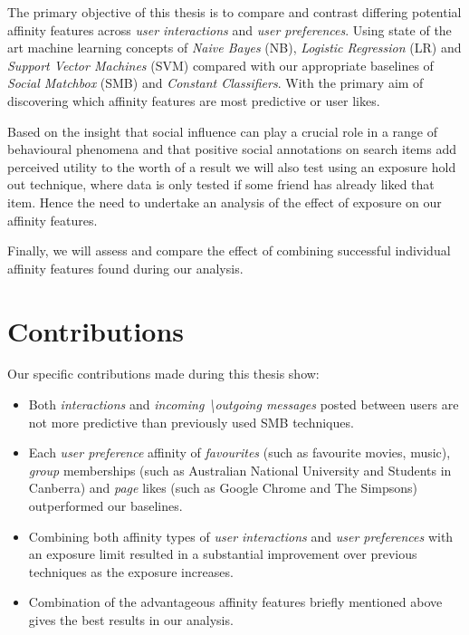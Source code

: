 The primary objective of this thesis is to compare and contrast differing potential affinity features across \emph{user interactions} and 
\emph{user preferences}. Using state of the art machine learning concepts of \emph{Naive Bayes} (NB), \emph{Logistic Regression} (LR) 
and \emph{Support Vector Machines} (SVM) compared with our appropriate baselines of \emph{Social Matchbox} (SMB) and \emph{Constant Classifiers}. 
With the primary aim of discovering which affinity features are most predictive or user likes.

Based on the insight that social inﬂuence can play a crucial role in a range of behavioural phenomena \cite{grano,watts} and that
positive social annotations on search items add perceived utility to the worth of a result \cite{pantel} we will 
also test using an exposure hold out technique, where data is only tested if some friend has already liked that item. Hence
the need to undertake an analysis of the effect of exposure on our affinity features.

Finally, we will assess and compare the effect of combining successful individual affinity features found during our analysis.

\section{Contributions}
\label{sec:contributions}

Our specific contributions made during this thesis show:

\begin{itemize}
\item Both \emph{interactions} and \emph{incoming \textbackslash outgoing messages} posted between users are not more predictive than 
previously used SMB techniques.
\item Each \emph{user preference} affinity of \emph{favourites} (such as favourite movies, music), \emph{group} memberships (such as Australian National University
and Students in Canberra) and \emph{page} likes (such as Google Chrome and The Simpsons) outperformed our baselines.
\item Combining both affinity types of \emph{user interactions} and \emph{user preferences} with an exposure limit resulted in a 
substantial improvement over previous techniques as the exposure increases.
\item Combination of the advantageous affinity features briefly mentioned above gives the best results in our analysis.
\end{itemize} 

